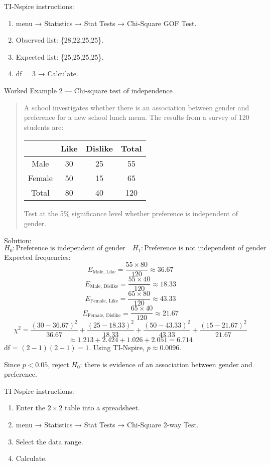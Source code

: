 \documentclass[11pt]{article}
\def\textbf#1{#1}%
\def\texttt#1{#1}%
\begin{document}
\textbf{TI-Nspire instructions:}
\begin{enumerate}
    \item \texttt{menu} → \texttt{Statistics} → \texttt{Stat Tests} → \texttt{Chi-Square GOF Test}.
    \item Observed list: \{28,22,25,25\}.
    \item Expected list: \{25,25,25,25\}.
    \item df = 3 → \texttt{Calculate}.
\end{enumerate}

\textbf{Worked Example 2 — Chi-square test of independence }
\begin{quote}
A school investigates whether there is an association between gender and preference for a new school lunch menu.  
The results from a survey of 120 students are:

\begin{center}
\begin{tabular}{|c|c|c|c|}
\hline
 & Like & Dislike & Total \\
\hline
Male & 30 & 25 & 55 \\
Female & 50 & 15 & 65 \\
\hline
Total & 80 & 40 & 120 \\
\hline
\end{tabular}
\end{center}
Test at the 5\% significance level whether preference is independent of gender.
\end{quote}

\textbf{Solution:}
\[
H_0: \text{Preference is independent of gender} \quad H_1: \text{Preference is not independent of gender}
\]
Expected frequencies:
\[
E_{\text{Male, Like}} = \frac{55 \times 80}{120} \approx 36.67
\]
\[
E_{\text{Male, Dislike}} = \frac{55 \times 40}{120} \approx 18.33
\]
\[
E_{\text{Female, Like}} = \frac{65 \times 80}{120} \approx 43.33
\]
\[
E_{\text{Female, Dislike}} = \frac{65 \times 40}{120} \approx 21.67
\]
\[
\chi^2 = \frac{(30-36.67)^2}{36.67} + \frac{(25-18.33)^2}{18.33} + \frac{(50-43.33)^2}{43.33} + \frac{(15-21.67)^2}{21.67}
\]
\[
\approx 1.213 + 2.424 + 1.026 + 2.051 = 6.714
\]
df = $(2-1)(2-1) = 1$.  
Using TI-Nspire, $p \approx 0.0096$.

Since $p < 0.05$, reject $H_0$: there is evidence of an association between gender and preference.

\textbf{TI-Nspire instructions:}
\begin{enumerate}
    \item Enter the $2\times 2$ table into a spreadsheet.
    \item \texttt{menu} → \texttt{Statistics} → \texttt{Stat Tests} → \texttt{Chi-Square 2-way Test}.
    \item Select the data range.
    \item \texttt{Calculate}.
\end{enumerate}
\end{document}
